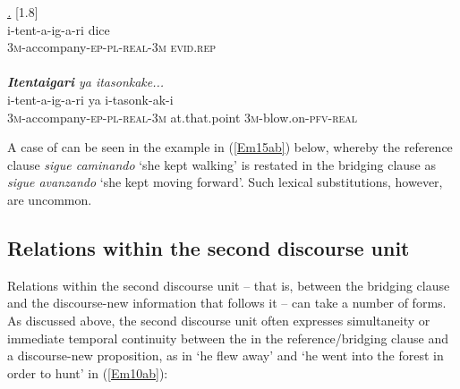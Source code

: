 \documentclass[output=paper]{LSP/langsci}
\begin{document}
\begin{exe}
\ex \label{Em09ab}
\begin{xlist}
\ex \label{Emex:09a}
\glt \textit{\underline{.}} [1.8]\\
\gll i-tent-a-ig-a-ri dice \\
 \textsc{3m-}accompany\textsc{-ep-pl-real-3m} \textsc{evid.rep}\\
\glt {}\\
\ex \label{Emex:09b}
\glt \textit{\textbf{Itentaigari} ya itasonkake...}\\
\gll i-tent-a-ig-a-ri ya i-tasonk-ak-i\\     	      
   \textsc{3m-}accompany\textsc{-ep-pl-real-3m} at.that.point \textsc{3m-}blow.on\textsc{-pfv-real}\\
\glt {}
\end{xlist}
\end{exe}


A case of  can be seen in the  example in (\ref{Em15ab}) below, where\-by the reference clause \textit{sigue caminando} `she kept walking' is restated in the bridging clause as \textit{sigue avanzando} `she kept moving forward'. Such lexical substitutions, however, are uncommon. 
%
\subsection{Relations within the second discourse unit}
\label{Em2ndunit}
Relations within the second discourse unit – that is, between the bridging clause and the discourse-new information that follows it – can take a number of forms. As discussed above, the second discourse unit often expresses simultaneity or immediate temporal continuity between the  in the reference/bridging clause and a discourse-new proposition, as in `he flew away' and `he went into the forest in order to hunt' in (\ref{Em10ab}): 
\end{document}
